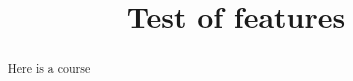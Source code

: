 \documentclass{xourse}
\title{Test of features}
\begin{document}
\begin{abstract}
Here is a course
\end{abstract}
\maketitle

\end{document}
